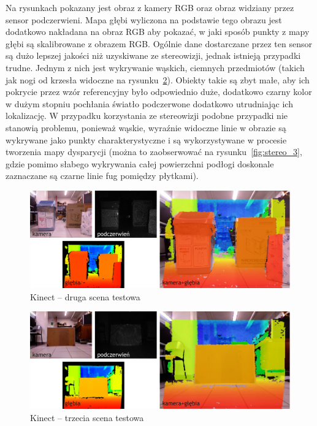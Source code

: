 Na rysunkach pokazany jest obraz z kamery RGB oraz obraz widziany przez sensor
podczerwieni. Mapa głębi wyliczona na podstawie tego obrazu jest dodatkowo nakładana
na obraz RGB aby pokazać, w jaki sposób punkty z mapy głębi są skalibrowane z obrazem RGB.
Ogólnie dane dostarczane przez ten sensor są dużo lepszej jakości niż uzyskiwane
ze stereowizji, jednak istnieją przypadki trudne. Jednym z nich jest wykrywanie
wąskich, ciemnych przedmiotów (takich jak nogi od krzesła widoczne na
rysunku~\ref{fig:kinect_3}). Obiekty takie są zbyt małe, aby ich pokrycie przez
wzór referencyjny było odpowiednio duże, dodatkowo czarny kolor w dużym stopniu
pochłania światło podczerwone dodatkowo utrudniając ich lokalizację. W przypadku
korzystania ze stereowizji podobne przypadki nie stanowią problemu, ponieważ
wąskie, wyraźnie widoczne linie w obrazie są wykrywane jako punkty charakterystyczne
i są wykorzystywane w procesie tworzenia mapy dysparycji (można to zaobserwować
na rysunku~\ref{fig:stereo_3}, gdzie pomimo słabego wykrywania całej powierzchni
podłogi doskonale zaznaczane są czarne linie fug pomiędzy płytkami).

\begin{figure}[h!]
\centering
\includegraphics[width=\columnwidth]{../img/kinect_2}
\caption[Kinect -- druga scena testowa]{Kinect -- druga scena testowa}
\label{fig:kinect_2}
\end{figure}

\begin{figure}[h!]
\centering
\includegraphics[width=\columnwidth]{../img/kinect_3}
\caption[Kinect -- trzecia scena testowa]{Kinect -- trzecia scena testowa}
\label{fig:kinect_3}
\end{figure}

